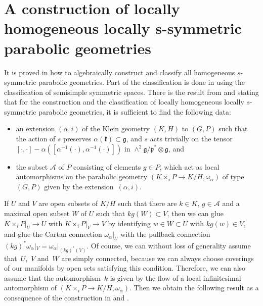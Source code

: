 \documentclass[10pt,a4paper]{amsart}
\newcommand{\om}{\omega}
\newcommand{\fg}{\mathfrak g}
\newcommand{\fp}{\mathfrak p}
\newcommand{\fk}{\mathfrak k}
\numberwithin{equation}{section}
\begin{document}
\appendix

\section[A construction of locally homogeneous locally $s$-symmetric parabolic geometries]{A construction of locally homogeneous locally $\boldsymbol{s}$-symmetric\\ parabolic geometries}\label{sec5}

It is proved in \cite[Section 2]{GZ2} how to algebraically construct and classify all homogeneous $s$-symmetric parabolic geometries. Part of the classif\/ication is done in \cite{G2,G3} using the classif\/ication of semisimple symmetric spaces. There is the result from \cite[Section~1.3]{disertace} and \cite[Lemma~2.2]{GZ2} stating that for the construction and the classif\/ication of locally homogeneous locally $s$-symmetric parabolic geometries, it is suf\/f\/icient to f\/ind the following data:
\begin{itemize}\itemsep=0pt
\item an extension $(\alpha,i)$ of the Klein geometry $(K,H)$ to $(G,P)$ such that the action of $s$ preserves $\alpha(\fk)\subset \fg$, and $s$ acts trivially on the tensor $[\cdot ,\cdot ]-\alpha([\alpha^{-1}(\cdot ),\alpha^{-1}(\cdot )])$ in $\wedge^2 \fg/\fp^*\otimes \fg$, and
\item the subset $\mathcal{A}$ of $P$ consisting of elements $g\in P$, which act as local automorphisms on the parabolic geometry $(K\times_{i}P\to K/H,\om_\alpha)$ of type $(G,P)$ given by the extension~$(\alpha,i)$.
\end{itemize}

If $U$ and $V$ are open subsets of $K/H$ such that there are $k\in K$, $g\in\mathcal{A}$ and a maximal open subset $W$ of $U$ such that $kg(W)\subset V$, then we can glue $K\times_{i}P|_U\to U$ with $K\times_{i}P|_V\to V$ by identifying $w\in W\subset U$ with $kg(w)\in V$, and glue the Cartan connection $\om_\alpha|_U$ with the pullback connection $(kg)^*\om_\alpha|_V=\om_\alpha|_{(kg)^*(V)}$. Of course, we can without loss of generality assume that~$U$,~$V$ and~$W$ are simply connected, because we can always choose coverings of our manifolds by open sets satisfying this condition. Therefore, we can also assume that the automorphism~$k$ is given by the f\/low of a local inf\/initesimal automorphism of $(K\times_{i}P\to K/H,\om_\alpha)$. Then we obtain the following result as a consequence of the construction in \cite[Section~3]{GZ3} and \cite[Section~1.3]{disertace}.
\end{document}
